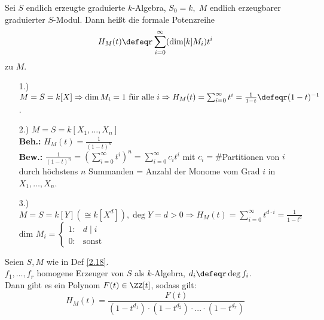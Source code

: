 \begin{Def}
\label{2.18}
  Sei $S$ endlich erzeugte graduierte $k$-Algebra, $S_0 = k,\; M$ endlich
  erzeugbarer graduierter $S$-Modul. Dann heißt die formale Potenzreihe $$H_M(t)
  \defeqr \sum_{i=0}^{\infty} (\dim[k]{M_i}) t^i$$
   zu $M$.
\end{Def}

\begin{nnBsp}
  \begin{enumerate}
    \item[1.)] $M = S = k[X] \Rightarrow \dim{M_i} = 1 \text{ für alle }i
               \Rightarrow H_M(t) = \sum_{i=0}^{\infty}t^i = \frac{1}{1-t}
               \defeqr (1-t)^{-1}$.
    \item[2.)] $M = S = k[X_1, \dots, X_n]$\\
               \textbf{Beh.:} $H_M(t) = \frac{1}{(1-t)^n}$\\
               \textbf{Bew.:} $\frac{1}{(1-t)^n} = \left( \sum_{i=0}^{\infty}
               t^i\right)^n = \sum_{i=0}^{\infty} c_i t^i$ mit $c_i =
               \#$Partitionen von $i$ durch höchstens $n$ Summanden = Anzahl der
               Monome vom Grad $i$ in $X_1, \dots, X_n$.
    \item[3.)] $M = S = k[Y] (\cong k[X^d]), \deg{Y} = d > 0 \Rightarrow
               H_M(t) = \sum_{i = 0}^{\infty} t^{d \cdot i} = \frac{1}{1-t^d}$\\
               dim $M_i = \begin{cases}1: & d \mid i\\ 0: & \text{sonst} \end{cases}$
  \end{enumerate}
\end{nnBsp}

\begin{nnSatz}
  Seien $S, M$ wie in Def \ref{2.18}.\\
  $f_1, \dots, f_r$ homogene Erzeuger von $S$ als $k$-Algebra, $d_i \defeqr
  \deg{f_i}$.\\
  Dann gibt es ein Polynom $F(t) \in \ZZ[t]$, sodass gilt:
  $$ H_M(t) = \frac{F(t)}{(1-t^{d_1}) \cdot (1-t^{d_2}) \cdot ... \cdot 
  (1-t^{d_r})}$$
\end{nnSatz}

